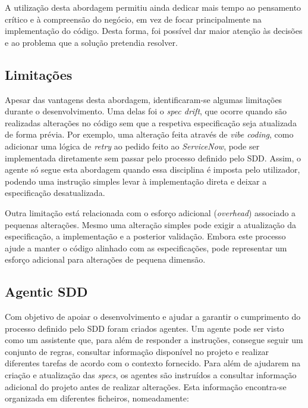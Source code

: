 		A utilização desta abordagem permitiu ainda dedicar mais tempo ao pensamento crítico e à compreensão do negócio, em vez de focar principalmente na implementação do código. Desta forma, foi possível dar maior atenção às decisões e ao problema que a solução pretendia resolver.
	
	\subsection{Limitações}
		
		Apesar das vantagens desta abordagem, identificaram-se algumas limitações durante o desenvolvimento. Uma delas foi o \textit{spec drift}, que ocorre quando são realizadas alterações no código sem que a respetiva especificação seja atualizada de forma prévia. Por exemplo, uma alteração feita através de \textit{vibe coding}, como adicionar uma lógica de \textit{retry} ao pedido feito ao \textit{ServiceNow}, pode ser implementada diretamente sem passar pelo processo definido pelo \gls{SDD}. Assim, o agente só segue esta abordagem quando essa disciplina é imposta pelo utilizador, podendo uma instrução simples levar à implementação direta e deixar a especificação desatualizada.
		
		Outra limitação está relacionada com o esforço adicional (\textit{overhead}) associado a pequenas alterações. Mesmo uma alteração simples pode exigir a atualização da especificação, a implementação e a posterior validação. Embora este processo ajude a manter o código alinhado com as especificações, pode representar um esforço adicional para alterações de pequena dimensão.
	
	\subsection{Agentic \gls{SDD}}
	
		Com objetivo de apoiar o desenvolvimento e ajudar a garantir o cumprimento do processo definido pelo \gls{SDD} foram criados agentes. Um agente pode ser visto como um assistente que, para além de responder a instruções, consegue seguir um conjunto de regras, consultar informação disponível no projeto e realizar diferentes tarefas de acordo com o contexto fornecido. Para além de ajudarem na criação e atualização das \textit{specs}, os agentes são instruídos a consultar informação adicional do projeto antes de realizar alterações. Esta informação encontra-se organizada em diferentes ficheiros, nomeadamente:
		
